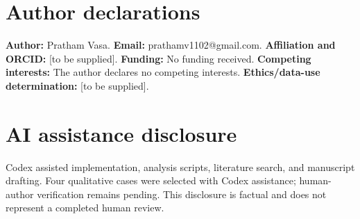 \documentclass[11pt]{article}
\begin{document}
\section*{Author declarations}

\textbf{Author:} Pratham Vasa. \textbf{Email:} prathamv1102@gmail.com. \textbf{Affiliation and ORCID:} [to be supplied]. \textbf{Funding:} No funding received. \textbf{Competing interests:} The author declares no competing interests. \textbf{Ethics/data-use determination:} [to be supplied].

\section*{AI assistance disclosure}

Codex assisted implementation, analysis scripts, literature search, and manuscript drafting. Four qualitative cases were selected with Codex assistance; human-author verification remains pending. This disclosure is factual and does not represent a completed human review.



\end{document}
